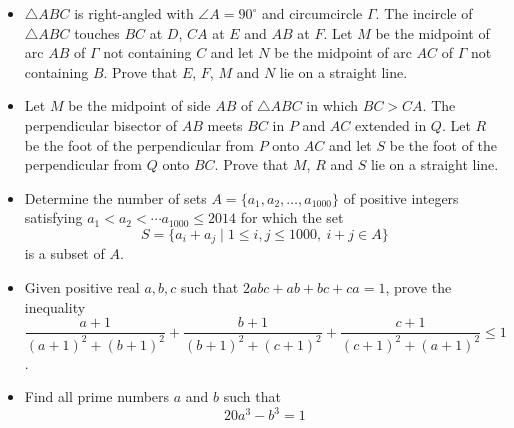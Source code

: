 \documentclass[12pt]{article}
\begin{document}
\begin{itemize}
\item %
$\triangle ABC$ is right-angled with $\angle A=90^\circ$ and circumcircle $\Gamma$. The incircle of $\triangle ABC$ touches $BC$ at $D$, $CA$ at $E$ and $AB$ at $F$. Let $M$ be the midpoint of arc $AB$ of $\Gamma$ not containing $C$ and let $N$ be the midpoint of arc $AC$ of $\Gamma$ not containing $B$. Prove that $E$, $F$, $M$ and $N$ lie on a straight line.


\item %
Let $M$ be the midpoint of side $AB$ of $\triangle ABC$ in which $BC>CA$. The perpendicular bisector of $AB$ meets $BC$ in $P$ and $AC$ extended in $Q$. Let $R$ be the foot of the perpendicular from $P$ onto $AC$ and let $S$ be the foot of the perpendicular from $Q$ onto $BC$. Prove that $M$, $R$ and $S$ lie on a straight line.


\item %
Determine the number of sets $A=\{a_1,a_2,\ldots, a_{1000}\}$ of positive integers satisfying $a_1<a_2<\cdots a_{1000}\le 2014$ for which the set
	\[ S = \{a_i+a_j\mid 1\le i,j\le 1000,\ i+j\in A\} \]
is a subset of $A$.

\item %
Given positive real $a,b,c$ such that $2abc+ab+bc+ca=1$, prove the inequality
\begin{equation*}
\frac{a+1}{(a+1)^2+(b+1)^2}+\frac{b+1}{(b+1)^2+(c+1)^2}+\frac{c+1}{(c+1)^2+(a+1)^2}\leq 1
\end{equation*}.

\item %
Find all prime numbers $a$ and $b$ such that
\begin{equation*}
20a^3-b^3=1
\end{equation*}


\end{itemize}

\vfill

\centering
\begin{BVerbatim}
\end{BVerbatim}
\end{document}
